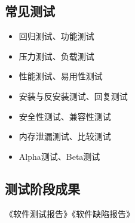 \documentclass[UTF8,nofonts]{ctexart}
\begin{document}
\subsection{\textbf{常见测试}}
\begin{itemize}
 \setlength{\itemsep}{0pt}
 \setlength{\parskip}{0pt}
 \setlength{\parsep}{0pt}
\item 回归测试、功能测试
\item 压力测试、负载测试
\item	性能测试、易用性测试
\item	安装与反安装测试、回复测试
\item	安全性测试、兼容性测试
\item	内存泄漏测试、比较测试
\item	Alpha测试、Beta测试
\end{itemize}
\subsection{\textbf{测试阶段成果}}
《软件测试报告》《软件缺陷报告》
\end{document}
